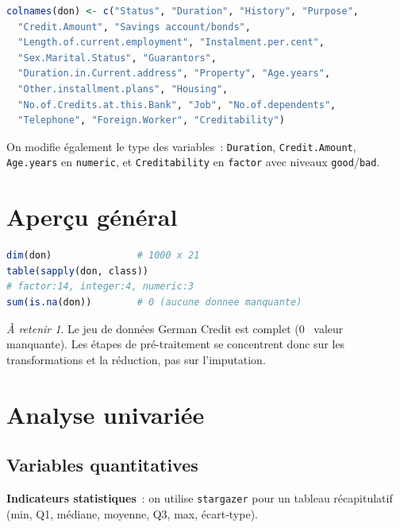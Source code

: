 \documentclass[a4paper,11pt]{article}
\theoremstyle{definition}
\theoremstyle{remark}
\newtheorem*{important}{À retenir}
\begin{document}
\begin{lstlisting}[language=R]
colnames(don) <- c("Status", "Duration", "History", "Purpose",
  "Credit.Amount", "Savings account/bonds",
  "Length.of.current.employment", "Instalment.per.cent",
  "Sex.Marital.Status", "Guarantors",
  "Duration.in.Current.address", "Property", "Age.years",
  "Other.installment.plans", "Housing",
  "No.of.Credits.at.this.Bank", "Job", "No.of.dependents",
  "Telephone", "Foreign.Worker", "Creditability")
\end{lstlisting}

On modifie également le type des variables~: \texttt{Duration},
\texttt{Credit.Amount}, \texttt{Age.years} en \texttt{numeric},
et \texttt{Creditability} en \texttt{factor} avec niveaux
\texttt{good}/\texttt{bad}.

\section{Aperçu général}

\begin{lstlisting}[language=R]
dim(don)               # 1000 x 21
table(sapply(don, class))
# factor:14, integer:4, numeric:3
sum(is.na(don))        # 0 (aucune donnee manquante)
\end{lstlisting}

\begin{important}
  Le jeu de données German Credit est complet (0~ valeur manquante).
  Les étapes de pré-traitement se concentrent donc sur les
  transformations et la réduction, pas sur l'imputation.
\end{important}

\section{Analyse univariée}

\subsection{Variables quantitatives}

\textbf{Indicateurs statistiques}~: on utilise \texttt{stargazer}
pour un tableau récapitulatif (min, Q1, médiane, moyenne, Q3, max,
écart-type).
\end{document}
